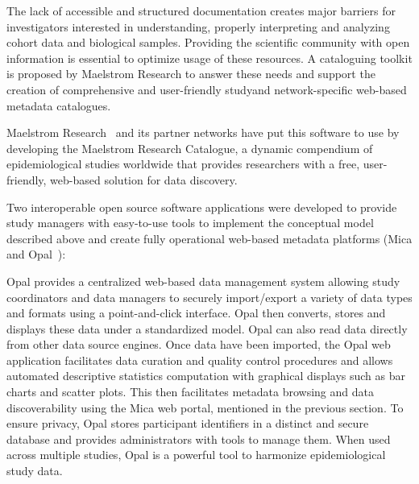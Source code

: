 The lack of accessible and structured documentation creates major barriers for investigators interested in understanding, properly interpreting and analyzing cohort data and biological samples.
Providing the scientific community with open information is essential to optimize usage of these resources.
A cataloguing toolkit is proposed by Maelstrom Research to answer these needs and support the creation of comprehensive and user-friendly studyand network-specific web-based metadata catalogues.


Maelstrom Research~\cite{maelstrom} and its partner networks have put this software to use by developing the Maelstrom Research Catalogue, a dynamic compendium of epidemiological studies worldwide that provides researchers with a free, user-friendly, web-based solution for data discovery.


Two interoperable open source software applications were developed to provide study managers with easy-to-use tools to implement the conceptual model described above and create fully operational web-based metadata platforms (Mica and Opal~\cite{mica}):

Opal provides a centralized web-based data management system allowing study coordinators and data managers to securely import/export a variety of data types and formats using a point-and-click interface.
Opal then converts, stores and displays these data under a standardized model.
Opal can also read data directly from other data source engines.
Once data have been imported, the Opal web application facilitates data curation and quality control procedures and allows automated descriptive statistics computation with graphical displays such as bar charts and scatter plots.
This then facilitates metadata browsing and data discoverability using the Mica web portal, mentioned in the previous section.
To ensure privacy, Opal stores participant identifiers in a distinct and secure database and provides administrators with tools to manage them.
When used across multiple studies, Opal is a powerful tool to harmonize epidemiological study data.

